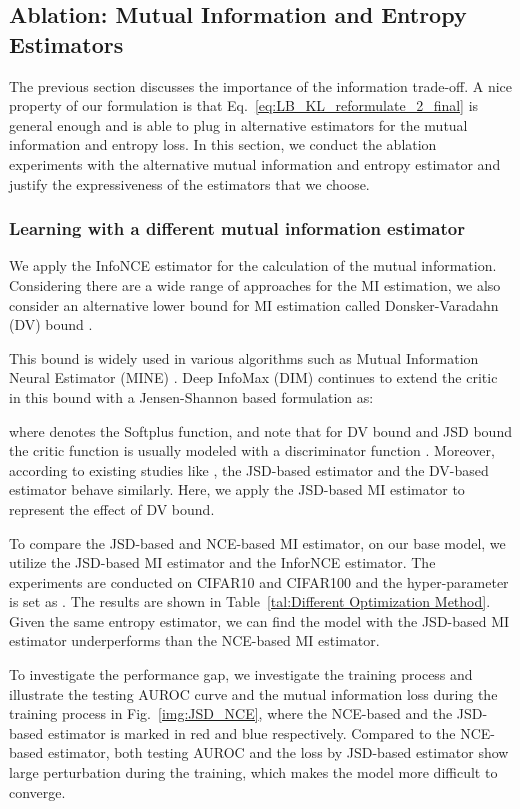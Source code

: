 \documentclass[journal]{IEEEtran}
\theoremstyle{remark}
\begin{document}
\subsection{Ablation: Mutual Information and Entropy Estimators}
The previous section discusses the importance of the information trade-off. A nice property of our formulation is that Eq.~\ref{eq:LB_KL_reformulate_2_final} is general enough and is able to plug in alternative estimators for the mutual information and entropy loss. In this section, we conduct the ablation experiments with the alternative mutual information and entropy estimator and justify the expressiveness of the estimators that we choose.


\subsubsection{\textbf{Learning with a different mutual information estimator}}\label{sec:whatdoHdo}
We apply the InfoNCE estimator \cite{gutmann2010noise} for the calculation of the mutual information. Considering there are a wide range of approaches for the MI estimation, we also consider an alternative lower bound for MI estimation called Donsker-Varadahn (DV) bound \cite{donsker1975large}. 

This bound is widely used in various algorithms such as Mutual Information Neural Estimator (MINE) \cite{MINE}. Deep InfoMax (DIM) \cite{DIM} continues to extend the critic in this bound with a Jensen-Shannon based formulation as:

where  denotes the Softplus function, and note that for DV bound and JSD bound the critic function  is usually modeled with a discriminator function . Moreover, according to existing studies like \cite{DIM}, the JSD-based estimator and the DV-based estimator behave similarly. Here, we apply the JSD-based MI estimator to represent the effect of DV bound.

To compare the JSD-based and NCE-based MI estimator, on our base model, we utilize the JSD-based MI estimator and the InforNCE estimator. The experiments are conducted on CIFAR10 and CIFAR100 and the hyper-parameter is set as . The results are shown in Table~\ref{tal:Different Optimization Method}. Given the same entropy estimator, we can find the model with the JSD-based MI estimator underperforms than the NCE-based MI estimator. 

To investigate the performance gap, we investigate the training process and illustrate the testing AUROC curve and the mutual information loss during the training process in Fig.~\ref{img:JSD_NCE}, where the NCE-based and the JSD-based estimator is marked in red and blue respectively. Compared to the NCE-based estimator, both testing AUROC and the loss by JSD-based estimator show large perturbation during the training, which makes the model more difficult to converge. 
\end{document}
